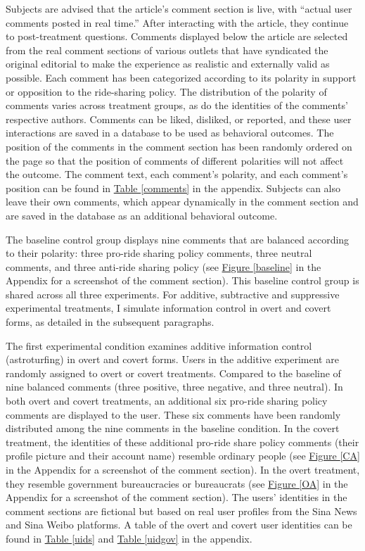 \documentclass[11pt]{article}
\begin{document}
Subjects are advised that the article's comment section is live, with ``actual user comments posted in real time.'' After interacting with the article, they continue to post-treatment questions. Comments displayed below the article are selected from the real comment sections of various outlets that have syndicated the original editorial to make the experience as realistic and externally valid as possible. Each comment has been categorized according to its polarity in support or opposition to the ride-sharing policy. The distribution of the polarity of comments varies across treatment groups, as do the identities of the comments' respective authors. Comments can be liked, disliked, or reported, and these user interactions are saved in a database to be used as behavioral outcomes. The position of the comments in the comment section has been randomly ordered on the page so that the position of comments of different polarities will not affect the outcome. The comment text, each comment's polarity, and each comment's position can be found in \hyperref[comments]{Table \ref*{comments}} in the appendix. Subjects can also leave their own comments, which appear dynamically in the comment section and are saved in the database as an additional behavioral outcome.

The baseline control group displays nine comments that are balanced according to their polarity: three pro-ride sharing policy comments, three neutral comments, and three anti-ride sharing policy (see \hyperref[baseline]{Figure \ref*{baseline}} in the Appendix for a screenshot of the comment section). This baseline control group is shared across all three experiments. For additive, subtractive and suppressive experimental treatments, I simulate information control in overt and covert forms, as detailed in the subsequent paragraphs.

The first  experimental condition examines additive information control (astroturfing) in overt and covert forms. Users in the additive experiment are randomly assigned to overt or covert treatments. Compared to the baseline of nine balanced comments (three positive, three negative, and three neutral). In both overt and covert treatments, an additional six pro-ride sharing policy comments are displayed to the user. These six comments have been randomly distributed among the nine comments in the baseline condition. In the covert treatment, the identities of these additional pro-ride share policy comments (their profile picture and their account name) resemble ordinary people (see \hyperref[CA]{Figure \ref*{CA}} in the Appendix for a screenshot of the comment section). In the overt treatment, they resemble government bureaucracies or bureaucrats  (see \hyperref[OA]{Figure \ref*{OA}} in the Appendix for a screenshot of the comment section). The users' identities in the comment sections are fictional but based on real user profiles from the Sina News and Sina Weibo platforms. A table of the overt and covert user identities can be found in \hyperref[uids]{Table \ref*{uids}} and \hyperref[uidgov]{Table \ref*{uidgov}} in the appendix.
\end{document}
